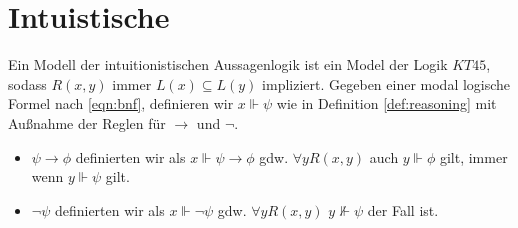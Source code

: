\section{Intuistische \ML} %
\label{sec:intuistische_ml}

\begin{definition}
	\label{intuistischeLogiken}
	Ein Modell der intuitionistischen Aussagenlogik ist ein Model \modelFormel der Logik $KT45$, sodass $R(x,y)$ immer $L(x) \subseteq L(y)$ impliziert.
	Gegeben einer modal logische Formel nach \eqref{eqn:bnf}, definieren wir $x \Vdash \psi$ wie in Definition \eqref{def:reasoning} mit Außnahme der Reglen für $\rightarrow$ und $\neg$.
	\begin{itemize}
		\item $\psi \rightarrow \phi$ definierten wir als $x \Vdash \psi \rightarrow \phi$ gdw. $\forall y R(x,y)$ auch $y \Vdash \phi$ gilt, immer wenn $y \Vdash \psi$ gilt.
		\item $\neg \psi$ definierten wir als $x \Vdash \neg \psi$ gdw. $\forall y R(x,y)$ $y \nVdash \psi$ der Fall ist.
	\end{itemize}
\end{definition}
\cite[S.328]{huth2004logic}


